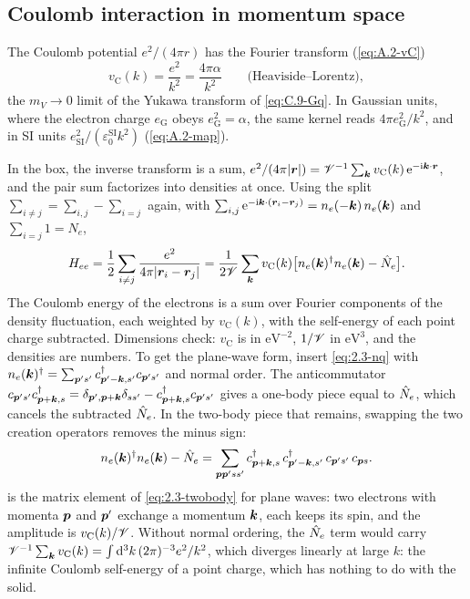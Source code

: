 \subsection{Coulomb interaction in momentum space}

The Coulomb potential $e^2/(4\pi r)$ has the Fourier transform (\cref{eq:A.2-vC})
\begin{equation}
  v_{\mathrm{C}}(k) = \frac{e^2}{k^2} = \frac{4\pi\alpha}{k^2} \qquad \text{(Heaviside--Lorentz)} ,
  \label{eq:2.3-vC}
\end{equation}
the $m_V \to 0$ limit of the Yukawa transform of \cref{eq:C.9-Gq}. In Gaussian units, where the electron charge $e_{\mathrm{G}}$ obeys $e_{\mathrm{G}}^2 = \alpha$, the same kernel reads $4\pi e_{\mathrm{G}}^2/k^2$, and in SI units $e_{\mathrm{SI}}^2/(\varepsilon_0^{\mathrm{SI}}k^2)$ (\cref{eq:A.2-map}).

In the box, the inverse transform is a sum, $e^2/(4\pi|\bm{r}|) = \mathscr{V}^{-1}\sum_{\bm{k}}v_{\mathrm{C}}(k)\,\mathrm{e}^{-\mathrm{i}\bm{k}\cdot\bm{r}}$, and the pair sum factorizes into densities at once. Using the split $\sum_{i\ne j} = \sum_{i,j} - \sum_{i=j}$ again, with $\sum_{i,j}\mathrm{e}^{-\mathrm{i}\bm{k}\cdot(\bm{r}_i - \bm{r}_j)} = n_e(-\bm{k})\,n_e(\bm{k})$ and $\sum_{i=j}1 = N_e$,
\begin{equation}
  H_{ee} = \frac12\sum_{i\ne j}\frac{e^2}{4\pi|\bm{r}_i - \bm{r}_j|}
  = \frac{1}{2\mathscr{V}}\sum_{\bm{k}}v_{\mathrm{C}}(k)\bigl[n_e(\bm{k})^\dagger n_e(\bm{k}) - \hat{N}_e\bigr] .
  \label{eq:2.3-Hee-density}
\end{equation}
The Coulomb energy of the electrons is a sum over Fourier components of the density fluctuation, each weighted by $v_{\mathrm{C}}(k)$, with the self-energy of each point charge subtracted. Dimensions check: $v_{\mathrm{C}}$ is in $\mathrm{eV}^{-2}$, $1/\mathscr{V}$ in $\mathrm{eV}^3$, and the densities are numbers. To get the plane-wave form, insert \cref{eq:2.3-nq} with $n_e(\bm{k})^\dagger = \sum_{\bm{p}'s'}c^\dagger_{\bm{p}'-\bm{k},s'}c_{\bm{p}'s'}$ and normal order. The anticommutator $c_{\bm{p}'s'}c^\dagger_{\bm{p}+\bm{k},s} = \delta_{\bm{p}',\bm{p}+\bm{k}}\delta_{ss'} - c^\dagger_{\bm{p}+\bm{k},s}c_{\bm{p}'s'}$ gives a one-body piece equal to $\hat{N}_e$, which cancels the subtracted $\hat{N}_e$. In the two-body piece that remains, swapping the two creation operators removes the minus sign:
\begin{equation}
  n_e(\bm{k})^\dagger n_e(\bm{k}) - \hat{N}_e = \sum_{\bm{p}\bm{p}'ss'}c^\dagger_{\bm{p}+\bm{k},s}\,c^\dagger_{\bm{p}'-\bm{k},s'}\,c_{\bm{p}'s'}\,c_{\bm{p}s} .
  \label{eq:2.3-normal}
\end{equation}
 is the matrix element of \cref{eq:2.3-twobody} for plane waves: two electrons with momenta $\bm{p}$ and $\bm{p}'$ exchange a momentum $\bm{k}$, each keeps its spin, and the amplitude is $v_{\mathrm{C}}(k)/\mathscr{V}$. Without normal ordering, the $\hat{N}_e$ term would carry $\mathscr{V}^{-1}\sum_{\bm{k}}v_{\mathrm{C}}(k) = \int\mathrm{d}^3k\,(2\pi)^{-3}e^2/k^2$, which diverges linearly at large $k$: the infinite Coulomb self-energy of a point charge, which has nothing to do with the solid.

